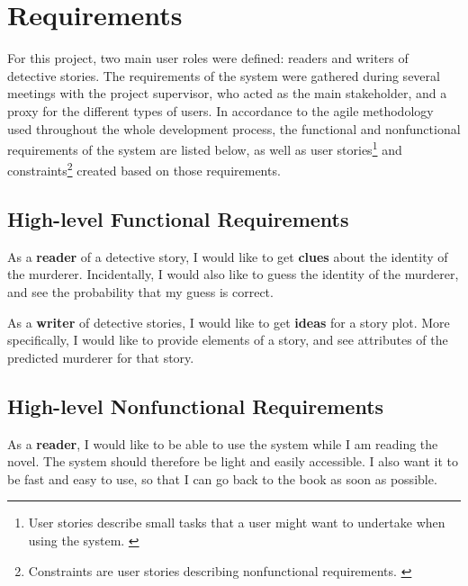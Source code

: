 \documentclass{mproj}
\begin{document}
\chapter{Requirements}

For this project, two main user roles were defined: readers and writers of detective stories. The requirements of the system were gathered during several meetings with the project supervisor, who acted as the main stakeholder, and a proxy for the different types of users. 
In accordance to the agile methodology used throughout the whole development process, the functional and nonfunctional requirements of the system are listed below, as well as user stories\footnote{User stories describe small tasks that a user might want to undertake when using the system. \cite{userstoriesbook}} and constraints\footnote{Constraints are user stories describing nonfunctional requirements. \cite{userstoriesbook}} created based on those requirements. 


\section{High-level Functional Requirements}
	
As a \textbf{reader} of a detective story, I would like to get \textbf{clues} about the identity of the murderer. Incidentally, I would also like to guess the identity of the murderer, and see the probability that my guess is correct. \par

As a \textbf{writer} of detective stories, I would like to get \textbf{ideas} for a story plot. More specifically, I would like to provide elements of a story, and see attributes of the predicted murderer for that story.\par

\section{High-level Nonfunctional Requirements}
	
As a \textbf{reader}, I would like to be able to use the system while I am reading the novel. The system should therefore be light and easily accessible. I also want it to be fast and easy to use, so that I can go back to the book as soon as possible. 

\end{document}
